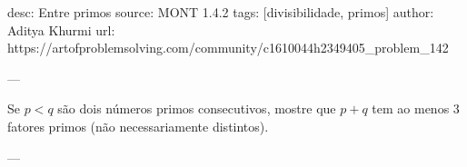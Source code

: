 desc: Entre primos
source:  MONT 1.4.2
tags:  [divisibilidade, primos]
author:  Aditya Khurmi
url:  https://artofproblemsolving.com/community/c1610044h2349405_problem_142

---

Se $p < q$ são dois números primos consecutivos, mostre que $p + q$ tem ao menos $3$ fatores primos (não necessariamente distintos).

---
